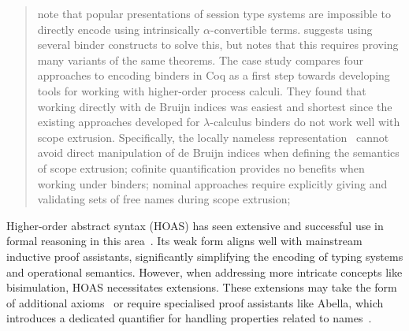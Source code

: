 \documentclass[runningheads]{llncs}
\begin{document}
\begin{quotation}
\cite{Castro-Perez2021,Castro2020} note that popular presentations of
session type systems are impossible to directly encode using
intrinsically \(\alpha\)-convertible terms.  \cite{Castro2020}
suggests using several binder constructs to solve this, but notes that
this requires proving many variants of the same theorems.
The case study \cite{AmbalLS21} compares four approaches to encoding
binders in Coq as a first step towards developing tools for working
with higher-order process calculi.  They found that working directly
with de Bruijn indices was easiest and shortest since the existing
approaches developed for $\lambda$-calculus binders do not work well
with scope extrusion.  Specifically, the locally nameless
representation~\cite{Chargueraud2012} cannot avoid direct manipulation
of de Bruijn indices when defining the semantics of scope extrusion;
cofinite quantification provides no benefits when working under
binders; nominal approaches require explicitly giving
and validating sets of free names during scope extrusion;
\end{quotation}


Higher-order abstract syntax (HOAS) has seen extensive and successful
use in formal reasoning in this area~\cite{Despeyroux2000,Honsell2001,Tiu2010,ChaudhuriCM15}. Its
weak form aligns well with mainstream inductive proof assistants,
significantly simplifying the encoding of typing systems and operational
semantics. However, when addressing more intricate concepts like
bisimulation, HOAS necessitates extensions. These extensions may take
the form of additional axioms~\cite{Honsell2001} or require specialised proof assistants
like Abella, which introduces a dedicated quantifier for handling
properties related to names~\cite{GacekMN11}.

\end{document}
